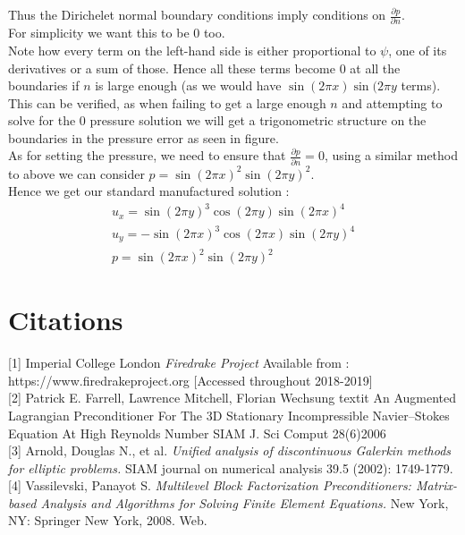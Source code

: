 \documentclass[11pt,twoside,a4paper]{article}
\begin{document}
Thus the Dirichelet normal boundary conditions imply conditions on $\frac{\partial p}{\partial n}$.\\
For simplicity we want this to be $0$ too.\\
Note how every term on the left-hand side is either proportional to $\psi$, one of its derivatives or a sum of those. Hence all these terms become $0$ at all the boundaries if $n$ is large enough (as we would have $ \sin(2 \pi x) \sin(2 \pi y$ terms).\\
This can be verified, as when failing to get a large enough $n$ and attempting to solve for the $0$ pressure solution we will get a trigonometric structure on the boundaries in the pressure error as seen in figure.\\
As for setting the pressure, we need to ensure that $\frac{\partial p} {\partial n} = 0$, using a similar method to above we can consider $p =  \sin(2 \pi x)^2 \sin(2 \pi y)^2$.\\
Hence we get our standard manufactured solution :
\begin{align}
u_x = \sin(2 \pi y)^3 \cos(2 \pi y)\sin(2 \pi x)^4 \\
u_y= -\sin(2 \pi x)^3 \cos(2 \pi x) \sin(2 \pi y)^4 \\
p = \sin(2 \pi x)^2 \sin(2 \pi y)^2
\end{align}
\section{Citations}

[1] Imperial College London \textit{Firedrake Project} Available from : https://www.firedrakeproject.org [Accessed throughout 2018-2019]\\

[2] Patrick E. Farrell, Lawrence Mitchell, Florian Wechsung
textit{ An Augmented Lagrangian Preconditioner For The 3D Stationary Incompressible Navier–Stokes Equation At High Reynolds Number}
SIAM J. Sci Comput 28(6)2006\\

[3] Arnold, Douglas N., et al. \textit{Unified analysis of discontinuous Galerkin methods for elliptic problems.} SIAM journal on numerical analysis 39.5 (2002): 1749-1779.\\

[4] Vassilevski, Panayot S. \textit{Multilevel Block Factorization Preconditioners: Matrix-based Analysis and Algorithms for Solving Finite Element Equations.} New York, NY: Springer New York, 2008. Web.\\
\end{document}
